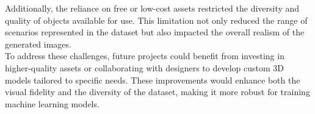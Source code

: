 \noindent Additionally, the reliance on free or low-cost assets restricted the diversity and quality of objects available for use. This limitation not only reduced the range of scenarios represented in the dataset but also impacted the overall realism of the generated images.\\

\noindent To address these challenges, future projects could benefit from investing in higher-quality assets or collaborating with designers to develop custom 3D models tailored to specific needs. These improvements would enhance both the visual fidelity and the diversity of the dataset, making it more robust for training machine learning models.



